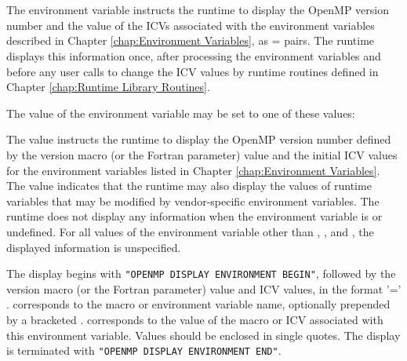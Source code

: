 \section{}
\label{sec:OMP_DISPLAY_ENV}
The  environment variable instructs the runtime to display the 
OpenMP version number and the value of the ICVs associated with the environment 
variables described in Chapter \ref{chap:Environment Variables}, 
as  =  pairs. The runtime displays this 
information once, after processing the environment variables and before any user calls 
to change the ICV values by runtime routines defined in Chapter \ref{chap:Runtime Library Routines}.

The value of the  environment variable may be set to one of these 
values:


The  value instructs the runtime to display the OpenMP version number defined by 
the  version macro (or the  Fortran parameter) value and 
the initial ICV values for the environment variables listed in 
Chapter \ref{chap:Environment Variables}. The  
value indicates that the runtime may also display the values 
of runtime variables that may be modified by vendor-specific 
environment variables. The runtime does not display any information 
when the  environment variable is 
 or undefined. For all values of the environment
variable other than , , and , 
the displayed information is unspecified.

The display begins with \texttt{"OPENMP DISPLAY ENVIRONMENT BEGIN"}, followed by 
the  version macro (or the  Fortran parameter) value and 
ICV values, in the format  '=' .  corresponds to the macro or 
environment variable name, optionally prepended by a bracketed .  
corresponds to the value of the macro or ICV associated with this environment variable. 
Values should be enclosed in single quotes. The display is terminated with 
\texttt{"OPENMP DISPLAY ENVIRONMENT END"}.

\pagebreak


